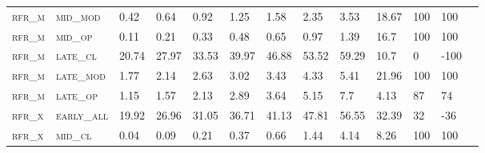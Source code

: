 \begin{landscape}
\begin{table}[!htbp]
\begin{tabular}{@{}lllllllllllll@{}}
\footnotesize \textsc{rfr\_m}      & \footnotesize \textsc{mid\_mod  }               & \footnotesize 0.42            & \footnotesize 0.64            & \footnotesize 0.92             & \footnotesize 1.25             & \footnotesize 1.58             & \footnotesize 2.35             & \footnotesize 3.53        & \footnotesize 18.67    & \footnotesize 100    & \footnotesize 100      \\
\footnotesize \textsc{rfr\_m}      & \footnotesize \textsc{mid\_op   }               & \footnotesize 0.11            & \footnotesize 0.21            & \footnotesize 0.33             & \footnotesize 0.48             & \footnotesize 0.65             & \footnotesize 0.97             & \footnotesize 1.39        & \footnotesize 16.7     & \footnotesize 100    & \footnotesize 100      \\
\footnotesize \textsc{rfr\_m}      & \footnotesize \textsc{late\_cl  }               & \footnotesize 20.74           & \footnotesize 27.97           & \footnotesize 33.53            & \footnotesize 39.97            & \footnotesize 46.88            & \footnotesize 53.52            & \footnotesize 59.29       & \footnotesize 10.7     & \footnotesize 0      & \footnotesize -100     \\
\footnotesize \textsc{rfr\_m}      & \footnotesize \textsc{late\_mod }               & \footnotesize 1.77            & \footnotesize 2.14            & \footnotesize 2.63             & \footnotesize 3.02             & \footnotesize 3.43             & \footnotesize 4.33             & \footnotesize 5.41        & \footnotesize 21.96    & \footnotesize 100    & \footnotesize 100      \\
\footnotesize \textsc{rfr\_m}      & \footnotesize \textsc{late\_op  }               & \footnotesize 1.15            & \footnotesize 1.57            & \footnotesize 2.13             & \footnotesize 2.89             & \footnotesize 3.64             & \footnotesize 5.15             & \footnotesize 7.7         & \footnotesize 4.13     & \footnotesize 87     & \footnotesize 74       \\
\footnotesize \textsc{rfr\_x}      & \footnotesize \textsc{early\_all}               & \footnotesize 19.92           & \footnotesize 26.96           & \footnotesize 31.05            & \footnotesize 36.71            & \footnotesize 41.13            & \footnotesize 47.81            & \footnotesize 56.55       & \footnotesize 32.39    & \footnotesize 32     & \footnotesize -36      \\
\footnotesize \textsc{rfr\_x}      & \footnotesize \textsc{mid\_cl   }               & \footnotesize 0.04            & \footnotesize 0.09            & \footnotesize 0.21             & \footnotesize 0.37             & \footnotesize 0.66             & \footnotesize 1.44             & \footnotesize 4.14        & \footnotesize 8.26     & \footnotesize 100    & \footnotesize 100      \\

\end{tabular}
\end{table}
\end{landscape}
